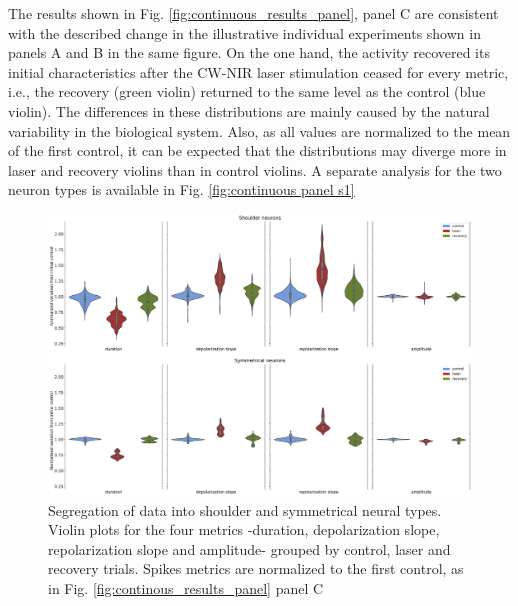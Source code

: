 The results shown in Fig. \ref{fig:continuous_results_panel}, panel C are consistent with the described change in the illustrative individual experiments shown in panels A and B in the same figure. On the one hand, the activity recovered its initial characteristics after the CW-NIR laser stimulation ceased for every metric, i.e., the recovery (green violin) returned to the same level as the control (blue violin). The differences in these distributions are mainly caused by the natural variability in the biological system. Also, as all values are normalized to the mean of the first control, it can be expected that the distributions may diverge more in laser and recovery violins than in control violins. A separate analysis for the two neuron types is available in Fig. \ref{fig:continuous panel s1}

\begin{figure}
	\includegraphics[width=\textwidth]{img/laser/FigureS1.eps}
	\caption{Segregation of data into shoulder and symmetrical neural types. Violin plots for the four metrics -duration, depolarization slope, repolarization slope and amplitude- grouped by control, laser and recovery trials. Spikes metrics are normalized to the first control, as in Fig. \ref{fig:continous_results_panel} panel C}
	\label{fig:continous panel s1}
\end{figure}

